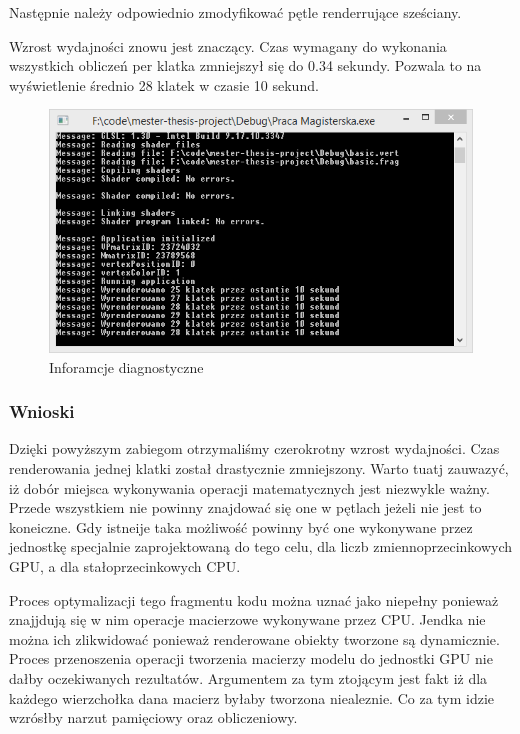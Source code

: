 

Następnie należy odpowiednio zmodyfikować pętle renderrujące sześciany.



Wzrost wydajności znowu jest znaczący. Czas wymagany do wykonania wszystkich obliczeń per klatka zmniejszył się do 0.34 sekundy. Pozwala to na wyświetlenie średnio 28 klatek w czasie 10 sekund.

\begin{figure}[h]
	\includegraphics[width=\textwidth]{images/optimized2_console}
	\caption{Inforamcje diagnostyczne}
\end{figure}

\subsubsection{Wnioski}
\thispagestyle{empty}
\par\indent

Dzięki powyższym zabiegom otrzymaliśmy czerokrotny wzrost wydajności. Czas renderowania jednej klatki został drastycznie zmniejszony. Warto tuatj zauwazyć, iż dobór miejsca wykonywania operacji matematycznych jest niezwykle ważny. Przede wszystkiem nie powinny znajdować się one w pętlach jeżeli nie jest to koneiczne. Gdy istneije taka możliwość powinny być one wykonywane przez jednostkę specjalnie zaprojektowaną do tego celu, dla liczb zmiennoprzecinkowych GPU, a dla stałoprzecinkowych CPU.

Proces optymalizacji tego fragmentu kodu można uznać jako niepełny ponieważ znajjdują się w nim operacje macierzowe wykonywane przez CPU. Jendka nie można ich zlikwidować ponieważ renderowane obiekty tworzone są dynamicznie. Proces przenoszenia operacji tworzenia  macierzy modelu do jednostki GPU nie dałby oczekiwanych rezultatów. Argumentem za tym ztojącym jest fakt iż dla każdego wierzchołka dana macierz byłaby tworzona niealeznie. Co za tym idzie wzrósłby narzut pamięciowy oraz obliczeniowy.
